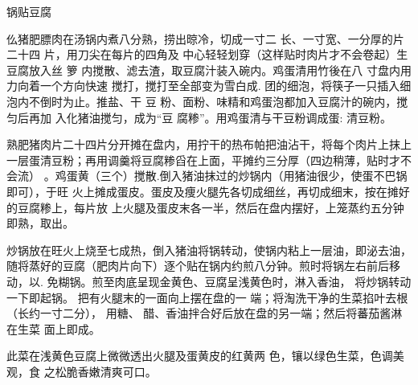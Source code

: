 \begin{recipe}{锅贴豆腐}

\ingredients


\preparation

仫猪肥膘肉在汤锅内煮八分熟，捞出晾冷，切成一寸二 长、一寸宽、一分厚的片二十四
片，用刀尖在每片的四角及 中心轻轻划穿（这样贴时肉片才不会卷起）生豆腐放入丝 箩
内搅散、滤去渣，取豆腐汁装入碗内。鸡蛋清用竹後在八 寸盘内用力向着一个方向快速
搅打，搅打至全部变为雪白成. 团的细泡，将筷子一只插入细泡内不倒时为止。推盐、干
豆 粉、面粉、味精和鸡蛋泡都加入豆腐汁的碗内，搅匀后再加 入化猪油搅匀，成为“豆
腐糁”。用鸡蛋清与干豆粉调成蛋: 清豆粉。

\step 熟肥猪肉片二十四片分开摊在盘内，用拧干的热布帕把油沾干，将每个肉片上抹上
一层蛋清豆粉；再用调羹将豆腐糁舀在上面，平摊约三分厚（四边稍薄，贴时才不会流）
。鸡蛋黄（三个）搅散.倒入猪油抹过的炒锅内（用猪油很少，使蛋不巴锅即可），于旺
火上摊成蛋皮。蛋皮及痩火腿先各切成细丝，再切成细末，按在摊好的豆腐糁上，每片放
上火腿及蛋皮末各一半，然后在盘内摆好，上笼蒸约五分钟即熟，取出。

\step 炒锅放在旺火上烧至七成热，倒入猪油将锅转动，使锅内粘上一层油，即泌去油，
随将蒸好的豆腐（肥肉片向下）逐个贴在锅内约煎八分钟。煎时将锅左右前后移动，以.
免糊锅。煎至肉底呈现金黄色、豆腐呈浅黄色时，淋入香油， 将炒锅转动一下即起锅。
把有火腿末的一面向上摆在盘的一 端；将淘洗干净的生菜掐叶去根（长约一寸二分），
用糖、 醋、香油拌合好后放在盘的另一端；然后将蕃茄酱淋在生菜 面上即成。

\features

此菜在浅黄色豆腐上微微透出火腿及蛋黄皮的红黄两 色，镶以绿色生菜，色调美观，食
之松脆香嫩清爽可口。

\end{recipe}

